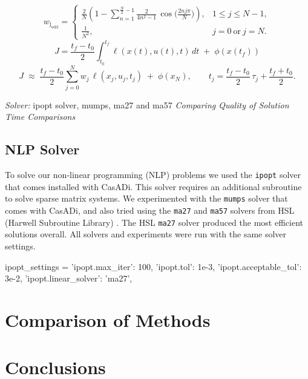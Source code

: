 \documentclass[]{article}
\begin{document}
	\[
        w_{\mathrm{j_{odd}}} =
        \begin{cases}
        \displaystyle
        \frac{2}{N}\!\left(
        1 - \sum_{n=1}^{\frac{N}{2}-1} \frac{2}{4n^{2}-1}\,
        \cos\!\Big(\tfrac{2 n j \pi}{N}\Big)
        \right), & 1 \le j \le N-1, \\[2ex]
        \displaystyle \frac{1}{N^{2}}, & j=0\ \text{or}\ j=N.
        \end{cases}
        \]
        	\[
	J=\frac{t_f-t_0}{2}\int_{t_0}^{t_f} \ell(x(t),u(t),t)\,dt \;+\; \phi(x(t_f))
        \]
        \[
        J \;\approx\; \frac{t_f-t_0}{2} \sum_{j=0}^{N} w_j \,\ell(x_j,u_j,t_j)
        \;+\; \phi(x_N),
        \qquad t_j = \frac{t_f-t_0}{2}\,\tau_j + \frac{t_f+t_0}{2}.
        \]
        	
 {\em Solver:} ipopt solver, mumps, ma27 and ma57
 {\em Comparing Quality of Solution}  
 {\em Time Comparisons} 

	

	
	
	\subsection*{NLP Solver}
	To solve our non-linear programming (NLP) problems we used the \texttt{ipopt} solver that comes installed with CasADi.  This solver requires an additional subroutine to  solve sparse matrix systems. We experimented with the \texttt{mumps}  solver that comes with CasADi, and also tried using the  \texttt{ma27} and  \texttt{ma57} solvers  from HSL (Harwell Subroutine Library) \cite{hsl}. The HSL \texttt{ma27} solver produced the most efficient solutions overall. All solvers and experiments were run with the same solver settings.
	\vspace{\baselineskip}
	\begin{python}
        ipopt_settings = {
			'ipopt.max_iter': 100,                  
			'ipopt.tol': 1e-3,                      	
			'ipopt.acceptable_tol': 3e-2,
			'ipopt.linear_solver': 'ma27',
		}
	\end{python}
	
	\section*{Comparison of Methods}
	\section*{Conclusions}
	
	
	
%	


\end{document}
